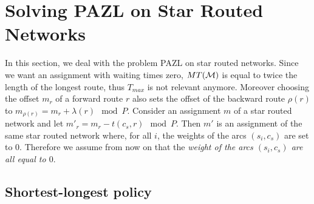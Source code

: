 \documentclass[10pt, conference, letterpaper]{IEEEtran}
\begin{document}
%
%      
%      
%
%      
%      
%
    
\section{Solving PAZL on Star Routed Networks} \label{sec:PAZL}
  
   
  
  In this section, we deal with the problem PAZL on star routed networks. Since we want an assignment with waiting times zero, $MT({\cal M})$ is equal to twice the length of the longest route, thus $T_{max}$ is not relevant anymore. Moreover choosing the offset $m_r$ of a forward route $r$ also sets the offset of the backward route $\rho(r)$ to $m_{\rho(r)} = m_{r} + \lambda(r) \mod P$.  Consider an assignment $m$ of a star routed network and let $m'_r= m_{r} - t(c_s,r) \mod P$.
  Then $m'$ is an assignment of the same star routed network where, for all $i$, the weights of the arcs $(s_i,c_s)$ are set to $0$. Therefore we assume from now on that the \emph{weight of the arcs $(s_i,c_s)$ are all equal to $0$}.
  
 
\subsection{Shortest-longest policy}
    
\end{document}
